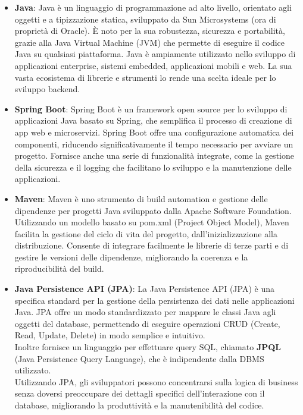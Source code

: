 \begin{itemize}
    \item \textbf{Java}: Java è un linguaggio di programmazione ad alto livello, 
    orientato agli oggetti e a tipizzazione statica, sviluppato da 
    Sun Microsystems (ora di proprietà di Oracle). È noto per la sua robustezza, 
    sicurezza e portabilità, grazie alla Java Virtual Machine (JVM) che permette di 
    eseguire il codice Java su qualsiasi piattaforma. Java è ampiamente utilizzato 
    nello sviluppo di applicazioni enterprise, sistemi embedded, applicazioni mobili e web. 
    La sua vasta ecosistema di librerie e strumenti lo rende una scelta ideale per lo sviluppo backend.
    \cite{JavaWikipedia}
 
    \item \textbf{Spring Boot}: Spring Boot è un framework open source 
    per lo sviluppo di applicazioni Java basato su Spring, che semplifica 
    il processo di creazione di app web e microservizi. 
    Spring Boot offre una configurazione automatica dei componenti, 
    riducendo significativamente il tempo necessario per avviare un progetto. Fornisce anche 
    una serie di funzionalità integrate, come la gestione della sicurezza e il logging 
    che facilitano lo sviluppo e la manutenzione delle applicazioni. \cite{MicrosoftSpringBoot}

    \item \textbf{Maven}: Maven è uno strumento di build automation e gestione 
    delle dipendenze per progetti Java sviluppato dalla Apache Software Foundation. 
    Utilizzando un modello basato su pom.xml  (Project Object Model), 
    Maven facilita la gestione del ciclo di vita del progetto, 
    dall'inizializzazione alla distribuzione. Consente di integrare facilmente le librerie 
    di terze parti e di gestire le versioni delle dipendenze, migliorando la coerenza e la 
    riproducibilità del build.
    \cite{MavenNexTre}

    \item \textbf{Java Persistence API (JPA)}: La Java Persistence API (JPA) è una specifica standard 
    per la gestione della persistenza dei dati nelle applicazioni Java. JPA offre un modo standardizzato
    per mappare le classi Java agli oggetti del database, permettendo di eseguire operazioni CRUD 
    (Create, Read, Update, Delete) in modo semplice e intuitivo.
    \\
    Inoltre fornisce un linguaggio per effettuare query SQL, chiamato \textbf{JPQL} 
    (Java Persistence Query Language), che è indipendente dalla DBMS utilizzato.
    \\
    Utilizzando JPA, gli sviluppatori possono concentrarsi sulla logica di business senza 
    doversi preoccupare dei dettagli specifici dell'interazione con il database, 
    migliorando la produttività e la manutenibilità del codice.
    \cite{JpaVincenzoRacca}


\end{itemize}
